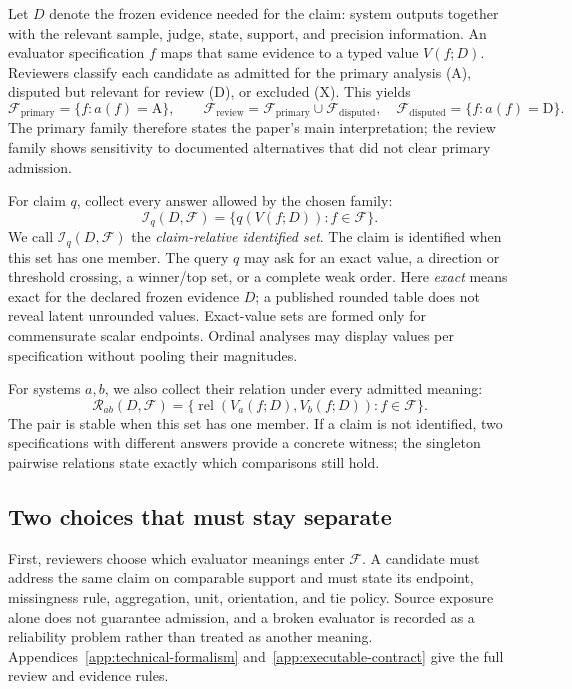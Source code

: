 \documentclass{article}
\newcommand{\F}{\mathcal F}
\newcommand{\Fpri}{\F_{\mathrm{primary}}}
\newcommand{\Frev}{\F_{\mathrm{review}}}
\newcommand{\Fdisp}{\F_{\mathrm{disputed}}}
\newcommand{\I}{\mathcal I}
\newcommand{\relset}{\mathcal R}
\begin{document}
Let \(D\) denote the frozen evidence needed for the claim: system outputs together with the relevant sample, judge, state, support, and precision information.  An evaluator specification \(f\) maps that same evidence to a typed value \(V(f;D)\).  Reviewers classify each candidate as admitted for the primary analysis (A), disputed but relevant for review (D), or excluded (X).  This yields
\begin{equation}
  \Fpri=\{f:a(f)=\mathrm A\},\qquad
  \Frev=\Fpri\cup\Fdisp,\quad \Fdisp=\{f:a(f)=\mathrm D\}.
  \label{eq:admission-families}
\end{equation}
The primary family therefore states the paper's main interpretation; the review family shows sensitivity to documented alternatives that did not clear primary admission.

For claim \(q\), collect every answer allowed by the chosen family:
\begin{equation}
  \I_q(D,\F)=\{q(V(f;D)):f\in\F\}.
  \label{eq:identified-set}
\end{equation}
We call \(\I_q(D,\F)\) the \emph{claim-relative identified set}.  The claim is identified when this set has one member.  The query \(q\) may ask for an exact value, a direction or threshold crossing, a winner/top set, or a complete weak order.  Here \emph{exact} means exact for the declared frozen evidence \(D\); a published rounded table does not reveal latent unrounded values.  Exact-value sets are formed only for commensurate scalar endpoints.  Ordinal analyses may display values per specification without pooling their magnitudes.

For systems \(a,b\), we also collect their relation under every admitted meaning:
\begin{equation}
  \relset_{ab}(D,\F)
  =\{\operatorname{rel}(V_a(f;D),V_b(f;D)):f\in\F\}.
  \label{eq:pairwise-image}
\end{equation}
The pair is stable when this set has one member.  If a claim is not identified, two specifications with different answers provide a concrete witness; the singleton pairwise relations state exactly which comparisons still hold.

\subsection{Two choices that must stay separate}

First, reviewers choose which evaluator meanings enter \(\F\).  A candidate must address the same claim on comparable support and must state its endpoint, missingness rule, aggregation, unit, orientation, and tie policy.  Source exposure alone does not guarantee admission, and a broken evaluator is recorded as a reliability problem rather than treated as another meaning.  Appendices~\ref{app:technical-formalism} and~\ref{app:executable-contract} give the full review and evidence rules.
\end{document}
